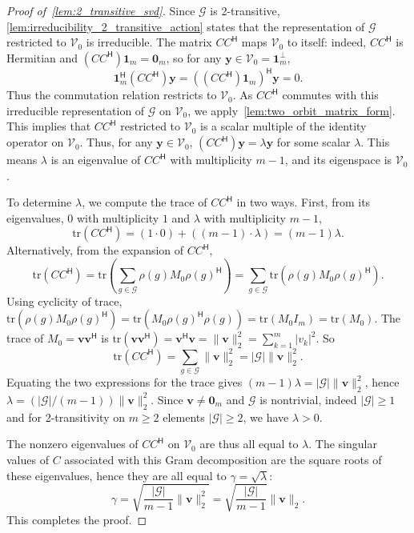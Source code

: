 \documentclass[11pt]{article}
\begin{document}
\begin{proof}[Proof of~\cref{lem:2_transitive_svd}]
Since \(\mathcal G\) is 2-transitive, \cref{lem:irreducibility_2_transitive_action} states that the representation of \(\mathcal G\) restricted to \(\mathcal V_0\) is irreducible. The matrix \(CC^{\mathsf H}\) maps \(\mathcal V_0\) to itself: indeed, \(CC^{\mathsf H}\) is Hermitian and \((CC^{\mathsf H})\boldsymbol{1}_m=\boldsymbol{0}_m\), so for any \(\boldsymbol{y}\in \mathcal V_0=\boldsymbol{1}_m^\perp\),
\[
\boldsymbol{1}_m^{\mathsf H}(CC^{\mathsf H})\boldsymbol{y}
=((CC^{\mathsf H})\boldsymbol{1}_m)^{\mathsf H}\boldsymbol{y}=0.
\]
Thus the commutation relation restricts to \(\mathcal V_0\). As \(CC^{\mathsf H}\) commutes with this irreducible representation of \(\mathcal G\) on \(\mathcal V_0\), we apply~\cref{lem:two_orbit_matrix_form}. This implies that \(CC^{\mathsf H}\) restricted to \(\mathcal V_0\) is a scalar multiple of the identity operator on \(\mathcal V_0\). Thus, for any \(\boldsymbol{y} \in \mathcal V_0\), \((CC^{\mathsf H})\boldsymbol{y} = \lambda \boldsymbol{y}\) for some scalar \(\lambda\). This means \(\lambda\) is an eigenvalue of \(CC^{\mathsf H}\) with multiplicity \(m-1\), and its eigenspace is \(\mathcal V_0\).

To determine \(\lambda\), we compute the trace of \(CC^{\mathsf H}\) in two ways. First, from its eigenvalues, \(0\) with multiplicity \(1\) and \(\lambda\) with multiplicity \(m-1\),
\[
\mathrm{tr}(CC^{\mathsf H}) = (1 \cdot 0) + ((m-1)\cdot \lambda) = (m-1)\lambda.
\]
Alternatively, from the expansion of \(CC^{\mathsf H}\),
\[
\mathrm{tr}(CC^{\mathsf H})
= \mathrm{tr}\left(\sum_{g \in \mathcal G} \rho(g) M_0 \rho(g)^{\mathsf H}\right)
= \sum_{g \in \mathcal G} \mathrm{tr}(\rho(g) M_0 \rho(g)^{\mathsf H}).
\]
Using cyclicity of trace, \(\mathrm{tr}(\rho(g) M_0 \rho(g)^{\mathsf H}) = \mathrm{tr}(M_0 \rho(g)^{\mathsf H}\rho(g)) = \mathrm{tr}(M_0 I_m) = \mathrm{tr}(M_0)\). The trace of \(M_0 = \boldsymbol{v}\boldsymbol{v}^{\mathsf H}\) is \(\mathrm{tr}(\boldsymbol{v}\boldsymbol{v}^{\mathsf H}) = \boldsymbol{v}^{\mathsf H}\boldsymbol{v} = \|\boldsymbol{v}\|_2^2 = \sum_{k=1}^m |v_k|^2\). So
\[
\mathrm{tr}(CC^{\mathsf H}) = \sum_{g \in \mathcal G} \|\boldsymbol{v}\|_2^2 = |\mathcal G| \|\boldsymbol{v}\|_2^2.
\]
Equating the two expressions for the trace gives \((m-1)\lambda = |\mathcal G| \|\boldsymbol{v}\|_2^2\), hence \(\lambda = (|\mathcal G|/(m-1))\|\boldsymbol{v}\|_2^2\). Since \(\boldsymbol{v} \neq \boldsymbol{0}_m\) and \(\mathcal G\) is nontrivial, indeed \(|\mathcal G| \ge 1\) and for 2-transitivity on \(m \ge 2\) elements \(|\mathcal G| \ge 2\), we have \(\lambda > 0\).

The nonzero eigenvalues of \(CC^{\mathsf H}\) on \(\mathcal V_0\) are thus all equal to \(\lambda\). The singular values of \(C\) associated with this Gram decomposition are the square roots of these eigenvalues, hence they are all equal to \(\gamma = \sqrt{\lambda}\):
\[
\gamma = \sqrt{\frac{|\mathcal G|}{m-1} \|\boldsymbol{v}\|_2^2}
= \sqrt{\frac{|\mathcal G|}{m-1}} \|\boldsymbol{v}\|_2.
\]
This completes the proof.
\end{proof}
\end{document}
